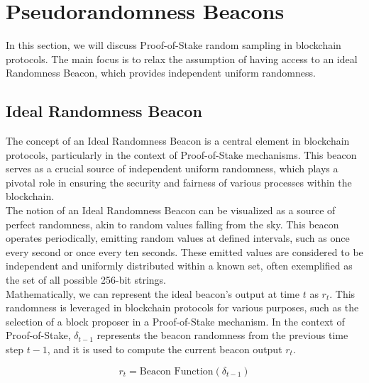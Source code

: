 \section{Pseudorandomness Beacons}
In this section, we will discuss Proof-of-Stake random sampling in blockchain protocols. The main focus is to relax the assumption of having access to an ideal Randomness Beacon, which provides independent uniform randomness.

\subsection{Ideal Randomness Beacon}
The concept of an Ideal Randomness Beacon is a central element in blockchain protocols, particularly in the context of Proof-of-Stake mechanisms. This beacon serves as a crucial source of independent uniform randomness, which plays a pivotal role in ensuring the security and fairness of various processes within the blockchain.\\
The notion of an Ideal Randomness Beacon can be visualized as a source of perfect randomness, akin to random values falling from the sky. This beacon operates periodically, emitting random values at defined intervals, such as once every second or once every ten seconds. These emitted values are considered to be independent and uniformly distributed within a known set, often exemplified as the set of all possible 256-bit strings.\\
Mathematically, we can represent the ideal beacon's output at time $t$ as $r_t$. This randomness is leveraged in blockchain protocols for various purposes, such as the selection of a block proposer in a Proof-of-Stake mechanism. In the context of Proof-of-Stake, $\delta_{t-1}$ represents the beacon randomness from the previous time step $t-1$, and it is used to compute the current beacon output $r_t$.

$$r_t = \text{Beacon Function}(\delta_{t-1})$$

